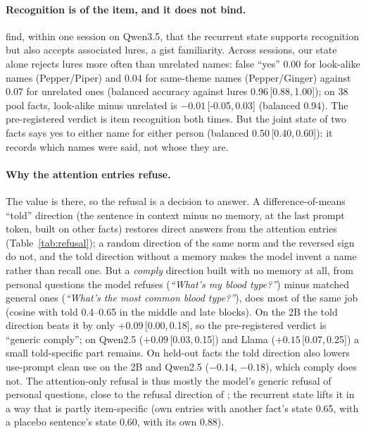 \documentclass[11pt]{article}
\newcommand{\ci}[2]{\,{\scriptsize[#1,\,#2]}}
\begin{document}
\paragraph{Recognition is of the item, and it does not bind.} \citet{afendulev2026hybrid} find, within one session
on Qwen3.5, that the recurrent state supports recognition but also accepts associated lures, a gist familiarity. Across
sessions, our state alone rejects lures more often than unrelated names: false ``yes'' 0.00 for look-alike names
(Pepper/Piper) and 0.04 for same-theme names (Pepper/Ginger) against 0.07 for unrelated ones (balanced accuracy against
lures 0.96\ci{0.88}{1.00}); on 38 pool facts, look-alike minus unrelated is $-0.01$\ci{-0.05}{0.03} (balanced 0.94).
The pre-registered verdict is item recognition both times. But the joint state of two facts says yes to either name
for either person (balanced 0.50\ci{0.40}{0.60}): it records which names were said, not whose they are.

\paragraph{Why the attention entries refuse.} The value is there, so the refusal is a decision to answer. A
difference-of-means ``told'' direction (the sentence in context minus no memory, at the last prompt token, built on
other facts) restores direct answers from the attention entries (Table~\ref{tab:refusal}); a random direction of the
same norm and the reversed sign do not, and the told direction without a memory makes the model invent a name rather
than recall one. But a \emph{comply} direction built with no memory at all, from personal questions the model refuses
(\textit{``What's my blood type?''}) minus matched general ones (\textit{``What's the most common blood type?''}), does
most of the same job (cosine with told 0.4--0.65 in the middle and late blocks). On the 2B the told direction beats it
by only $+0.09$\ci{0.00}{0.18}, so the pre-registered verdict is ``generic comply''; on Qwen2.5 ($+0.09$\ci{0.03}{0.15})
and Llama ($+0.15$\ci{0.07}{0.25}) a small told-specific part remains. On held-out facts the told direction also lowers
use-prompt clean use on the 2B and Qwen2.5 ($-0.14$, $-0.18$), which comply does not. The attention-only refusal is
thus mostly the model's generic refusal of personal questions, close to the refusal direction of
\citet{arditi2024refusal}; the recurrent state lifts it in a way that is partly item-specific (own entries with
another fact's state 0.65, with a placebo sentence's state 0.60, with its own 0.88).
\end{document}
